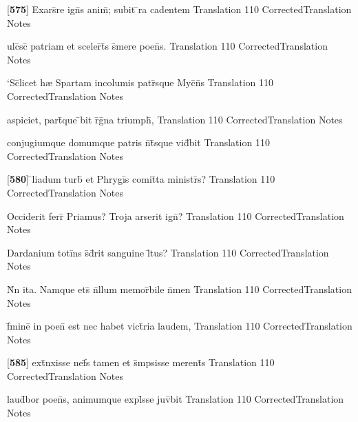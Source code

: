 \latline
  {[\textbf{575}] Exars\={}re ign\={}s anim\={}; subit \={\macron {\i}}ra cadentem}
  { Translation }
  {110}
  { CorrectedTranslation }
  { Notes }


\latline
  {ulc\={\macron {\i}}sc\={\macron {\i}} patriam et sceler\={}t\={}s s\={}mere poen\={}s.}
  { Translation }
  {110}
  { CorrectedTranslation }
  { Notes }


\latline
  {`Sc\={\macron {\i}}licet h{\ae} Spartam incolumis patr\={}sque Myc\={}n\={}s}
  { Translation }
  {110}
  { CorrectedTranslation }
  { Notes }


\latline
  {aspiciet, part\={}que \={\macron {\i}}bit r\={}g\={\macron {\i}}na triumph\={},}
  { Translation }
  {110}
  { CorrectedTranslation }
  { Notes }


\latline
  {conjugiumque domumque patris n\={}t\={}sque vid\={}bit}
  { Translation }
  {110}
  { CorrectedTranslation }
  { Notes }


\latline
  {[\textbf{580}] \={}liadum turb\={} et Phrygi\={\macron {\i}}s comit\={}ta ministr\={\macron {\i}}s?}
  { Translation }
  {110}
  { CorrectedTranslation }
  { Notes }


\latline
  {Occiderit ferr\={} Priamus?  Troja arserit ign\={\macron {\i}}?}
  { Translation }
  {110}
  { CorrectedTranslation }
  { Notes }


\latline
  {Dardanium toti\={}ns s\={}d\={}rit sanguine l\={\macron {\i}}tus?}
  { Translation }
  {110}
  { CorrectedTranslation }
  { Notes }


\latline
  {N\={}n ita.  Namque ets\={\macron {\i}} n\={}llum memor\={}bile n\={}men}
  { Translation }
  {110}
  { CorrectedTranslation }
  { Notes }


\latline
  {f\={}mine\={} in poen\={} est nec habet vict\={}ria laudem,}
  { Translation }
  {110}
  { CorrectedTranslation }
  { Notes }


\latline
  {[\textbf{585}] ext\={\macron {\i}}nxisse nef\={}s tamen et s\={}mpsisse merent\={\macron {\i}}s}
  { Translation }
  {110}
  { CorrectedTranslation }
  { Notes }


\latline
  {laud\={}bor poen\={}s, animumque expl\={}sse juv\={}bit}
  { Translation }
  {110}
  { CorrectedTranslation }
  { Notes }


